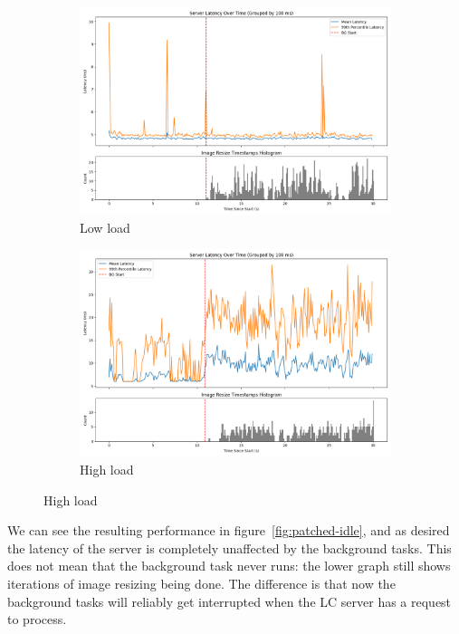 \begin{figure}[t]
    \centering
    \begin{subfigure}[t]{0.48\textwidth}
        \includegraphics[width=\textwidth]{graphs/patched-idle-low-two.png}
        \caption{Low load}\label{fig:patched-idle-low-two}
    \end{subfigure}
    \hspace{\fill}
    \begin{subfigure}[t]{0.48\textwidth}
        \includegraphics[width=\textwidth]{graphs/unedited-idle-high-two.png}
        \caption{High load}\label{fig:patched-idle-high-two}
    \end{subfigure}
\end{figure}\label{fig:patched-idle}

We can see the resulting performance in figure~\ref{fig:patched-idle}, and as
desired the latency of the server is completely unaffected by the background
tasks. This does not mean that the background task never runs: the lower graph
still shows iterations of image resizing being done. The difference is that now
the background tasks will reliably get interrupted when the LC server has a
request to process.

